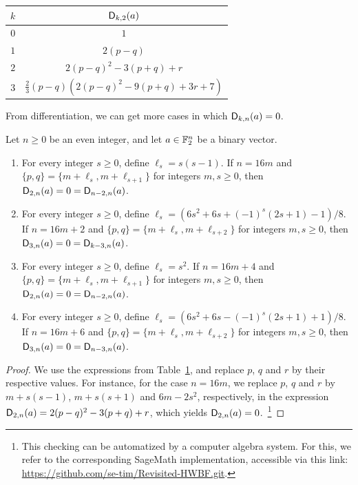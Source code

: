 \documentclass{llncs}
\begin{document}
\begin{table}
	\scriptsize
	\centering
	\begin{tabular}{|c|c|}
		\hline
		$k$ & $\Dnka 2ka$\\
		\hline
		$0$&$1$\\
		$1$&$2(p-q)$\\ 
		$2$&$2(p-q)^2-3(p+q)+r$\\
		$3$&$\frac 23(p-q)\left(2(p-q)^2-9(p+q)+3r+7\right)$\\
		\hline
	\end{tabular}
	\label{tab:Dnka_small_k}
\end{table}

From differentiation, we can get more cases in which $\Dnka nka=0$.

\begin{proposition}
    Let $n\geq 0$ be an even integer, and let $a\in\F_2^n$ be a binary vector.
    \begin{enumerate}
        \item For every integer $s\geq0$, define $\ell_s=s(s-1)$. If $n=16m$ and $\{p,q\}=\{m+\ell_s,m+\ell_{s+1}\}$ for integers $m,s\geq 0$, then $\Dnka n2a=0=\Dnka n{n-2}a$.
        \item For every integer $s\geq 0$, define $\ell_s=\left(6s^2+6s+(-1)^s(2s+1)-1\right)/8$. If $n=16m+2$ and $\{p,q\}=\{m+\ell_s,m+\ell_{s+2}\}$ for integers $m,s\geq 0$, then $\Dnka n3a=0=\Dnka n{k-3}a$.
        \item For every integer $s\geq 0$, define $\ell_s=s^2$. If $n=16m+4$ and $\{p,q\}=\{m+\ell_s,m+\ell_{s+1}\}$ for integers $m,s\geq 0$, then $\Dnka n2a=0=\Dnka n{n-2}a$.
        \item For every integer $s\geq 0$, define $\ell_s=\left(6s^2+6s-(-1)^s(2s+1)+1\right)/8$. If $n=16m+6$ and $\{p,q\}=\{m+\ell_s,m+\ell_{s+2}\}$ for integers $m,s\geq 0$, then $\Dnka n3a=0=\Dnka n{n-3}a$.
    \end{enumerate}
\end{proposition}

\begin{proof}
	We use the expressions from Table~\ref{tab:Dnka_small_k}, and replace $p$, $q$ and $r$ by their respective values. For instance, for the case $n=16m$, we replace $p$, $q$ and $r$ by $m+s(s-1)$, $m+s(s+1)$ and $6m-2s^2$, respectively, in the expression $\Dnka n2a=2(p-q)^2-3(p+q)+r$, which yields $\Dnka n2a=0$.~\footnote{This checking can be automatized by a computer algebra system.
	\ifnum{}
		For this, we refer to the corresponding \textsf{SageMath} implementation, accessible via this link: \url{https://github.com/se-tim/Revisited-HWBF.git}.
	\fi}
\end{proof}
\end{document}
